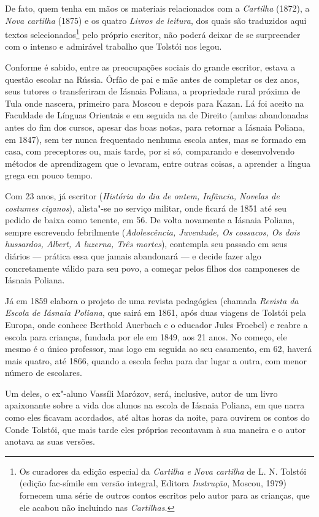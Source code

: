 De fato, quem tenha em mãos os materiais relacionados com
a \emph{Cartilha} (1872), a \emph{Nova cartilha} (1875) e os
quatro \emph{Livros de leitura}, dos quais são traduzidos aqui textos
selecionados\footnote{Os curadores da edição especial da \emph{Cartilha
  e Nova cartilha} de L. N. Tolstói (edição fac-símile em versão
  integral, Editora \emph{Instrução}, Moscou, 1979) fornecem uma série
  de outros contos escritos pelo autor para as crianças, que ele acabou
  não incluindo nas \emph{Cartilhas.}} pelo próprio escritor, não poderá deixar de se
surpreender com o intenso e admirável trabalho que Tolstói nos legou.

Conforme é sabido, entre as preocupações sociais do grande escritor,
estava a questão escolar na Rússia. Órfão de pai e mãe antes de
completar os dez anos, seus tutores o transferiram de Iásnaia Poliana, a
propriedade rural próxima de Tula onde nascera, primeiro para Moscou e
depois para Kazan. Lá foi aceito na Faculdade de Línguas Orientais e em
seguida na de Direito (ambas abandonadas antes do fim dos
cursos, apesar das boas notas, para retornar a Iásnaia Poliana, em
1847), sem ter nunca frequentado nenhuma escola antes, mas se formado em
casa, com preceptores ou, mais tarde, por si só, comparando e
desenvolvendo métodos de aprendizagem que o levaram, entre outras
coisas, a aprender a língua grega em pouco tempo. 

Com 23 anos, já escritor (\emph{História do dia de ontem, Infância,
Novelas de costumes ciganos}), alista"-se no serviço militar, onde ficará
de 1851 até seu pedido de baixa como tenente, em 56. De volta novamente
a Iásnaia Poliana, sempre escrevendo febrilmente (\emph{Adolescência,
Juventude, Os cossacos, Os dois hussardos, Albert, A luzerna, Três
mortes}), contempla seu passado em seus diários --- prática essa que
jamais abandonará --- e decide fazer algo concretamente válido para seu
povo, a começar pelos filhos dos camponeses de Iásnaia Poliana.

Já em 1859 elabora o projeto de uma revista pedagógica
(chamada \emph{Revista da Escola de Iásnaia Poliana}, que sairá
em 1861, após duas viagens de Tolstói pela Europa, onde conhece Berthold
Auerbach e o educador Jules Froebel) e reabre a escola para crianças,
fundada por ele em 1849, aos 21 anos. No começo, ele mesmo é o
único professor, mas logo em seguida ao seu casamento, em 62, haverá
mais quatro, até 1866, quando a escola fecha para dar lugar a outra, com
menor número de escolares.

Um deles, o ex"-aluno Vassíli Marózov, será, inclusive, autor de um livro
apaixonante sobre a vida dos alunos na escola de Iásnaia
Poliana, em que narra como eles ficavam acordados, até altas horas da
noite, para ouvirem os contos do Conde Tolstói, que mais tarde eles
próprios recontavam à sua maneira e o autor anotava as suas
versões.

